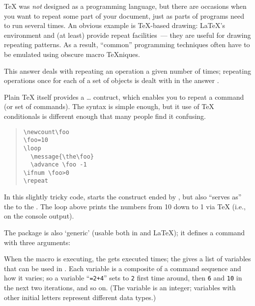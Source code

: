 
\TeX{} was \emph{not} designed as a programming language, but there
are occasions when you want to repeat some part of your document, just
as parts of programs need to run several times.  An obvious
example is \TeX{}-based drawing: \LaTeX{}'s 
environment and  (at least) provide repeat facilities~---
they are useful for drawing repeating patterns.  As a result,
``common'' programming techniques often have to be emulated using
obscure macro \TeX{}niques.

This answer deals with repeating an operation a given number of times;
repeating operations once for each of a set of objects is dealt with
in the answer .

Plain \TeX{} itself provides a  \dots{} 
contruct, which enables you to repeat a command (or set of commands).
The syntax is simple enough, but it use of \TeX{} conditionals is
different enough that many people find it confusing.
\begin{quote}
\begin{verbatim}
\newcount\foo
\foo=10
\loop
  \message{\the\foo}
  \advance \foo -1
\ifnum \foo>0
\repeat
\end{verbatim}
\end{quote}
In this slightly tricky code,  starts the construct ended by
, but  also ``serves as'' the  to the
.  The loop above prints the numbers from 10 down to 1 via
\TeX{}  (i.e., on the console output).

The  package is also `generic' (usable both in
\plaintex{} and \LaTeX{}); it defines a command  with
three arguments:
\begin{quote}
\end{quote}
When the macro is executing, the  gets executed
 times; the  gives a list of
variables that can be used in .  Each variable is a
composite of a command sequence and how it varies; so a variable
``\texttt{=2+4}'' sets  to \texttt{2} first time
around, then \texttt{6} and \texttt{10} in the next two iterations,
and so on.  (The variable  is an integer; variables with other
initial letters represent different data types.)

